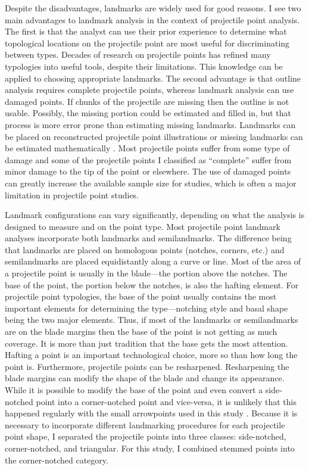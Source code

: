 \documentclass[letterpaper]{article}
\begin{document}
Despite the disadvantages, landmarks are widely used for good reasons. I see two main advantages to landmark analysis in the context of projectile point analysis. The first is that the analyst can use their prior experience to determine what topological locations on the projectile point are most useful for discriminating between types. Decades of research on projectile points has refined many typologies into useful tools, despite their limitations. This knowledge can be applied to choosing appropriate landmarks. The second advantage is that outline analysis requires complete projectile points, whereas landmark analysis can use damaged points. If chunks of the projectile are missing then the outline is not usable. Possibly, the missing portion could be estimated and filled in, but that process is more error prone than estimating missing landmarks. Landmarks can be placed on reconstructed projectile point illustrations or missing landmarks can be estimated mathematically \autocite{Gunz2009-yb}. Most projectile points suffer from some type of damage and some of the projectile points I classified as ``complete'' suffer from minor damage to the tip of the point or elsewhere. The use of damaged points can greatly increase the available sample size for studies, which is often a major limitation in projectile point studies.

Landmark configurations can vary significantly, depending on what the analysis is designed to measure and on the point type. Most projectile point landmark analyses incorporate both landmarks and semilandmarks. The difference being that landmarks are placed on homologous points (notches, corners, etc.) and semilandmarks are placed equidistantly along a curve or line. Most of the area of a projectile point is usually in the blade---the portion above the notches. The base of the point, the portion below the notches, is also the hafting element. For projectile point typologies, the base of the point usually contains the most important elements for determining the type---notching style and basal shape being the two major elements. Thus, if most of the landmarks or semilandmarks are on the blade margins then the base of the point is not getting as much coverage. It is more than just tradition that the base gets the most attention. Hafting a point is an important technological choice, more so than how long the point is. Furthermore, projectile points can be resharpened. Resharpening the blade margins can modify the shape of the blade and change its appearance. While it is possible to modify the base of the point and even convert a side-notched point into a corner-notched point and vice-versa, it is unlikely that this happened regularly with the small arrowpoints used in this study \autocite{Loendorf2019-df}. Because it is necessary to incorporate different landmarking procedures for each projectile point shape, I separated the projectile points into three classes: side-notched, corner-notched, and triangular. For this study, I combined stemmed points into the corner-notched category.
\end{document}
